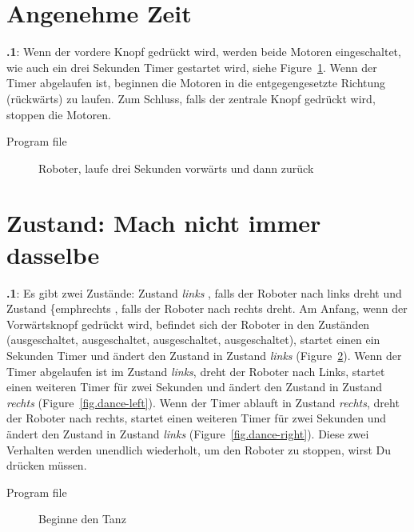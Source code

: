 \documentclass[12pt,a4paper]{article}
\begin{document}
\section{Angenehme Zeit}

\textbf{\thesection.1}:
Wenn der vordere Knopf gedrückt wird, werden beide Motoren eingeschaltet, wie auch ein drei Sekunden Timer gestartet wird, siehe Figure~\ref{fig.three}. Wenn der Timer abgelaufen ist, beginnen die Motoren in die entgegengesetzte Richtung (rückwärts) zu laufen. Zum Schluss, falls der zentrale Knopf gedrückt wird, stoppen die Motoren.

{\raggedleft \hfill Program file }


\begin{figure}[hbt]
\begin{center}
\caption{Roboter, laufe drei Sekunden vorwärts und dann zurück}
\label{fig.three}
\end{center}
\end{figure}


\section{Zustand: Mach nicht immer dasselbe}


\textbf{\thesection.1}:
Es gibt zwei Zustände: Zustand \emph{links} , falls der Roboter nach links dreht und Zustand \{emph{rechts}  , falls der Roboter nach rechts dreht. Am Anfang, wenn der Vorwärtsknopf gedrückt wird, befindet sich der Roboter in den Zuständen (ausgeschaltet, ausgeschaltet, ausgeschaltet, ausgeschaltet), startet einen ein Sekunden Timer und ändert den Zustand in Zustand \emph{links} (Figure~\ref{fig.dance-start}). Wenn der Timer abgelaufen ist im Zustand \emph{links}, dreht der Roboter nach Links, startet einen weiteren Timer für zwei Sekunden und ändert den Zustand in Zustand \emph{rechts} (Figure~\ref{fig.dance-left}). Wenn der Timer ablauft in Zustand \emph{rechts}, dreht der Roboter nach rechts, startet einen weiteren Timer für zwei Sekunden und ändert den Zustand in Zustand \emph{links} (Figure~\ref{fig.dance-right}). Diese zwei Verhalten werden unendlich wiederholt, um den Roboter zu stoppen, wirst Du drücken müssen.

{\raggedleft \hfill Program file }


\begin{figure}
\begin{center}
\caption{Beginne den Tanz}
\label{fig.dance-start}
\end{center}
\end{figure}
\end{document}
